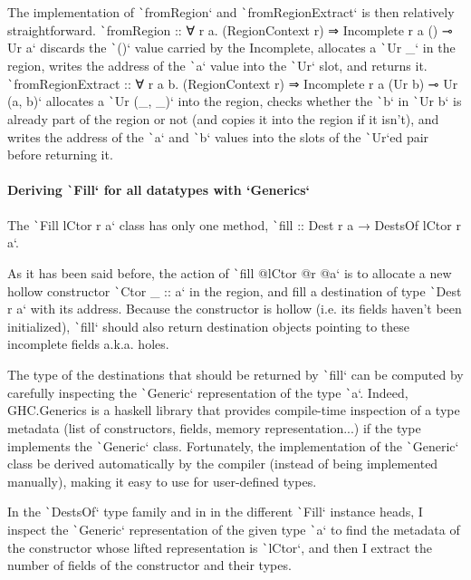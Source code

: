 \documentclass[english]{jflart}
\begin{document}
The implementation of \texttt`fromRegion` and \texttt`fromRegionExtract` is then relatively straightforward. \texttt`fromRegion :: ∀ r a. (RegionContext r) ⇒ Incomplete r a () ⊸ Ur a` discards the \texttt`()` value carried by the Incomplete, allocates a \texttt`Ur _` in the region, writes the address of the \texttt`a` value into the \texttt`Ur` slot, and returns it. \texttt`fromRegionExtract :: ∀ r a b. (RegionContext r) ⇒ Incomplete r a (Ur b) ⊸ Ur (a, b)` allocates a \texttt`Ur (_, _)` into the region, checks whether the \texttt`b` in \texttt`Ur b` is already part of the region or not (and copies it into the region if it isn't), and writes the address of the \texttt`a` and \texttt`b` values into the slots of the \texttt`Ur`ed pair before returning it.

\paragraph{Deriving \texttt`Fill` for all datatypes with `Generics`}

The \texttt`Fill lCtor r a` class has only one method, \texttt`fill :: Dest r a → DestsOf lCtor r a`.

As it has been said before, the action of \texttt`fill @lCtor @r @a` is to allocate a new hollow constructor \texttt`Ctor _ :: a` in the region, and fill a destination of type \texttt`Dest r a` with its address. Because the constructor is hollow (i.e. its fields haven't been initialized), \texttt`fill` should also return destination objects pointing to these incomplete fields a.k.a. holes.

The type of the destinations that should be returned by \texttt`fill` can be computed by carefully inspecting the \texttt`Generic` representation of the type \texttt`a`. Indeed, GHC.Generics is a haskell library that provides compile-time inspection of a type metadata (list of constructors, fields, memory representation...) if the type implements the \texttt`Generic` class. Fortunately, the implementation of the \texttt`Generic` class be derived automatically by the compiler (instead of being implemented manually), making it easy to use for user-defined types.

In the \texttt`DestsOf` type family and in in the different \texttt`Fill` instance heads, I inspect the \texttt`Generic` representation of the given type \texttt`a` to find the metadata of the constructor whose lifted representation is \texttt`lCtor`, and then I extract the number of fields of the constructor and their types.
\end{document}
